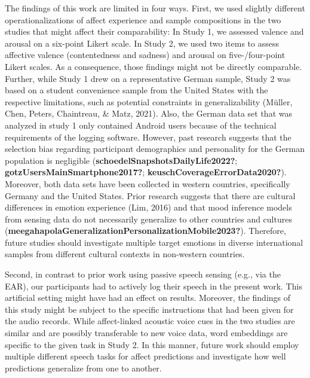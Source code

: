 \documentclass[
  english,
  man,floatsintext]{apa6}
\begin{document}
The findings of this work are limited in four ways. First, we used slightly different operationalizations of affect experience and sample compositions in the two studies that might affect their comparability: In Study 1, we assessed valence and arousal on a six-point Likert scale. In Study 2, we used two items to assess affective valence (contentedness and sadness) and arousal on five-/four-point Likert scales. As a consequence, those findings might not be directly comparable. Further, while Study 1 drew on a representative German sample, Study 2 was based on a student convenience sample from the United States with the respective limitations, such as potential constraints in generalizability (Müller, Chen, Peters, Chaintreau, \& Matz, 2021). Also, the German data set that was analyzed in study 1 only contained Android users because of the technical requirements of the logging software. However, past research suggests that the selection bias regarding participant demographics and personality for the German population is negligible (\textbf{schoedelSnapshotsDailyLife2022?}; \textbf{gotzUsersMainSmartphone2017?}; \textbf{keuschCoverageErrorData2020?}). Moreover, both data sets have been collected in western countries, specifically Germany and the United States. Prior research suggests that there are cultural differences in emotion experience (Lim, 2016) and that mood inference models from sensing data do not necessarily generalize to other countries and cultures (\textbf{meegahapolaGeneralizationPersonalizationMobile2023?}). Therefore, future studies should investigate multiple target emotions in diverse international samples from different cultural contexts in non-western countries.

Second, in contrast to prior work using passive speech sensing (e.g., via the EAR), our participants had to actively log their speech in the present work. This artificial setting might have had an effect on results. Moreover, the findings of this study might be subject to the specific instructions that had been given for the audio records. While affect-linked acoustic voice cues in the two studies are similar and are possibly transferable to new voice data, word embeddings are specific to the given task in Study 2. In this manner, future work should employ multiple different speech tasks for affect predictions and investigate how well predictions generalize from one to another.
\end{document}

